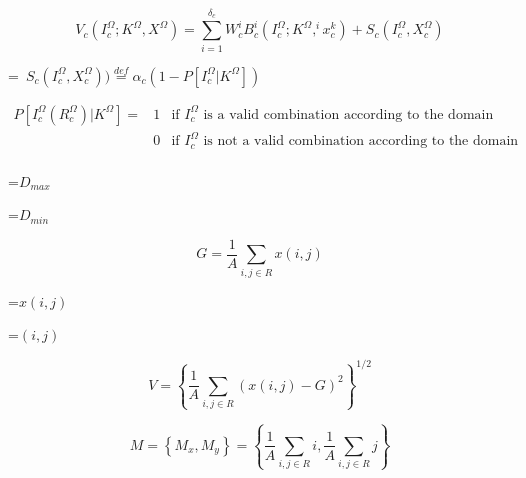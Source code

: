 {\newpage
\clearpage
\samepage \begin{equation}V_c(I_c^\Omega; K^\Omega, X^\Omega ) = \sum_{i=1}^{\delta_c}W_c^i B_c^i(I_c^\Omega; K^\Omega, ^ix_c^{k}) + S_c(I_c^\Omega, X_c^\Omega)
\end{equation}
}

{\newpage
\clearpage
\samepage \setbox\sizebox=\hbox{%
$ S_c(I_c^\Omega, X_c^\Omega)) \stackrel{def}{=}
  \alpha_c(1 - P[I_c^\Omega | K^\Omega])$}\box\sizebox
}

{\newpage
\clearpage
\samepage \begin{eqnarray}P[I_c^\Omega(R_c^\Omega) | K^\Omega] = & 1 & \mbox{if $I_c^\Omega$ is a valid combination according to the domain knowledge} \nonumber \\ 
 & 0 & \mbox{if $I_c^\Omega$ is not  a valid combination according to the domain knowledge} \nonumber \\ 
\end{eqnarray}
}

{\newpage
\clearpage
\samepage \setbox\sizebox=\hbox{$D_{max} $}\box\sizebox
}

{\newpage
\clearpage
\samepage \setbox\sizebox=\hbox{$D_{min} $}\box\sizebox
}

{\newpage
\clearpage
\samepage \begin{displaymath}G = \frac{1}{A} \sum_{i,j \in R} x(i,j) \end{displaymath}
}

{\newpage
\clearpage
\samepage \setbox\sizebox=\hbox{$x(i,j)$}\box\sizebox
}

{\newpage
\clearpage
\samepage \setbox\sizebox=\hbox{$(i,j)$}\box\sizebox
}

{\newpage
\clearpage
\samepage \begin{displaymath}V =  \left \{ \frac{1}{A} \sum_{i,j \in R} \left ( x(i,j) - G \right )^2 \right \}^{1/2} \end{displaymath}
}

{\newpage
\clearpage
\samepage \begin{displaymath}M = \left \{ M_x , M_y \right \}= \left \{ \frac{1}{A} \sum_{i,j \in R} i  ,
 \frac{1}{A} \sum_{i,j \in R} j  \right \}
\end{displaymath}
}


